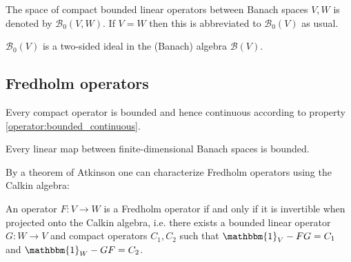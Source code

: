     \begin{notation}
        The space of compact bounded linear operators between Banach spaces $V, W$ is denoted by $\mathcal{B}_0(V, W)$. If $V=W$ then this is abbreviated to $\mathcal{B}_0(V)$ as usual.
    \end{notation}
    \begin{property}
        $\mathcal{B}_0(V)$ is a two-sided ideal in the (Banach) algebra $\mathcal{B}(V)$.
    \end{property}

\subsection{Fredholm operators}

    \begin{property}
        Every compact operator is bounded and hence continuous according to property \ref{operator:bounded_continuous}.
    \end{property}
    \begin{result}
        Every linear map between finite-dimensional Banach spaces is bounded.
    \end{result}



    By a theorem of Atkinson one can characterize Fredholm operators using the Calkin algebra:
    \begin{property}[Atkinson]
        An operator $F:V\rightarrow W$ is a Fredholm operator if and only if it is invertible when projected onto the Calkin algebra, i.e. there exists a bounded linear operator $G:W\rightarrow V$ and compact operators $C_1, C_2$ such that $\mathbbm{1}_V - FG = C_1$ and $\mathbbm{1}_W - GF = C_2$.
    \end{property}

